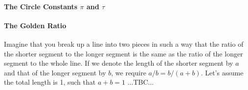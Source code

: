 \paragraph{The Circle Constants $\pi$ and $\tau$}



 
\paragraph{The Golden Ratio}
Imagine that you break up a line into two pieces in such a way that the ratio of the shorter segment to the longer segment is the same as the ratio of the longer segment to the whole line. If we denote the length of the shorter segment by $a$ and that of the longer segment by $b$, we require $a/b = b/(a+b)$. Let's assume the total length is 1, such that $a+b=1$ ...TBC...



